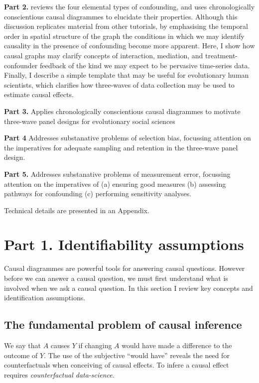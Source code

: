 \documentclass[
  singlecolumn]{report}
\begin{document}
\textbf{Part 2.} reviews the four elemental types of confounding, and
uses chronologically conscientious causal diagrammes to elucidate their
properties. Although this discussion replicates material from other
tutorials, by emphasising the temporal order in spatial structure of the
graph the conditions in which we may identify causality in the presence
of confounding become more apparent. Here, I show how causal graphs may
clarify concepts of interaction, mediation, and treatment-confounder
feedback of the kind we may expect to be pervasive time-series data.
Finally, I describe a simple template that may be useful for
evolutionary human scientists, which clarifies how three-waves of data
collection may be used to estimate causal effects.

\textbf{Part 3.} Applies chronologically conscientious causal diagrammes
to motivate three-wave panel designs for evolutionary social sciences

\textbf{Part 4} Addresses substanative problems of selection bias,
focussing attention on the imperatives for adequate sampling and
retention in the three-wave panel design.

\textbf{Part 5.} Addresses substanative problems of measurement error,
focussing attention on the imperatives of (a) ensuring good measures (b)
assessing pathways for confounding (c) performing sensitivity analyses.

Technical details are presented in an Appendix.

\hypertarget{part-1.-identifiability-assumptions}{%
\section{Part 1. Identifiability
assumptions}\label{part-1.-identifiability-assumptions}}

Causal diagrammes are powerful tools for answering causal questions.
However before we can answer a causal question, we must first understand
what is involved when we ask a causal question. In this section I review
key concepts and identification assumptions.

\hypertarget{the-fundamental-problem-of-causal-inference}{%
\subsection{The fundamental problem of causal
inference}\label{the-fundamental-problem-of-causal-inference}}

We say that \(A\) causes \(Y\) if changing \(A\) would have made a
difference to the outcome of \(Y\). The use of the subjective ``would
have'' reveals the need for counterfactuals when conceiving of causal
effects. To infere a causal effect requires \emph{counterfactual
data-science}.
\end{document}
